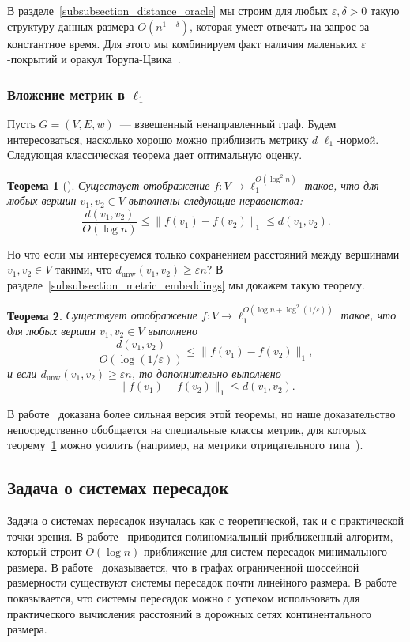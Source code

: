 \documentclass[12pt]{article}
\newcommand{\eps}{\varepsilon}
\newcommand{\dunw}{d_{\mathrm{unw}}}
\newtheorem{theorem}{Теорема}
\begin{document}
    В разделе~\ref{subsubsection_distance_oracle} мы строим для любых $\eps, \delta > 0$
    такую структуру данных размера $O(n^{1 + \delta})$, которая умеет отвечать на запрос за константное время.
    Для этого мы комбинируем факт наличия маленьких $\eps$-покрытий и оракул Торупа-Цвика~\cite{TZ05}.
    \subsubsection{Вложение метрик в $\ell_1$}
    Пусть $G = (V, E, w)$~--- взвешенный ненаправленный граф.
    Будем интересоваться, насколько хорошо можно приблизить метрику $d$ $\ell_1$-нормой.
    Следующая классическая теорема дает оптимальную оценку.
    \begin{theorem}[\cite{B85}]
        \label{theorem_bourgain}
        Существует отображение $f \colon V \to \ell_1^{O(\log^2 n)}$ такое, что для любых вершин 
        $v_1, v_2 \in V$ выполнены следующие неравенства:
        $$
            \frac{d(v_1, v_2)}{O(\log n)} \leq \|f(v_1) - f(v_2)\|_1 \leq d(v_1, v_2).
        $$
    \end{theorem}

    Но что если мы интересуемся только сохранением расстояний между вершинами $v_1, v_2 \in V$ такими, что
    $\dunw(v_1, v_2) \geq \eps n$? В разделе~\ref{subsubsection_metric_embeddings} мы докажем такую теорему.

    \begin{theorem}
        Существует отображение $f \colon V \to \ell_1^{O(\log n + \log^2 (1 / \eps))}$ такое, что для любых вершин 
        $v_1, v_2 \in V$ выполнено
        $$
            \frac{d(v_1, v_2)}{O(\log (1/\eps))} \leq \|f(v_1) - f(v_2)\|_1,
        $$
        и если $\dunw(v_1, v_2) \geq \eps n$, то дополнительно выполнено
        $$
            \|f(v_1) - f(v_2)\|_1 \leq d(v_1, v_2).
        $$
    \end{theorem}
    В работе~\cite{ABCDGKNS05} доказана более сильная версия этой теоремы, но наше доказательство непосредственно
    обобщается на
    специальные классы метрик, для которых теорему~\ref{theorem_bourgain} можно усилить (например, на метрики
    отрицательного типа~\cite{ALN05}).
    \subsection{Задача о системах пересадок}

    Задача о системах пересадок изучалась как с теоретической, так и с практической точки зрения.
    В работе~\cite{CHKZ02} приводится полиномиальный приближенный алгоритм, который строит $O(\log n)$-приближение
    для систем пересадок минимального размера.
    В работе~\cite{AFGW10} доказывается, что в графах ограниченной шоссейной размерности существуют системы пересадок
    почти линейного размера.
    В работе~\cite{ADGW11} показывается, что системы пересадок можно с успехом использовать для практического
    вычисления расстояний в дорожных сетях континентального размера.
\end{document}
